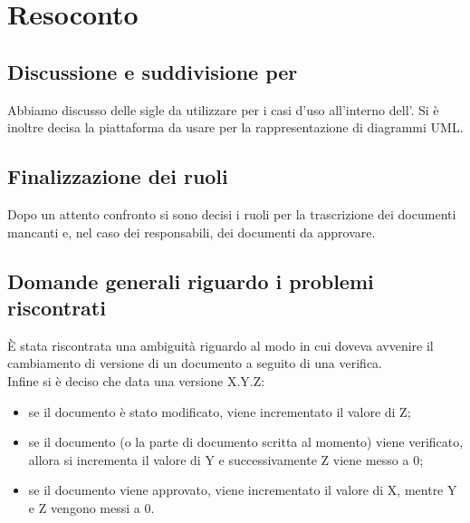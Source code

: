 \section{Resoconto}
\subsection{Discussione e suddivisione per \AdR}
Abbiamo discusso delle sigle da utilizzare per i casi d'uso all'interno dell'\AdR{}. Si è inoltre decisa la piattaforma da usare per la rappresentazione di diagrammi UML.

\subsection{Finalizzazione dei ruoli}
Dopo un attento confronto si sono decisi i ruoli per la trascrizione dei documenti mancanti e, nel caso dei responsabili, dei documenti da approvare. 

\subsection{Domande generali riguardo i problemi riscontrati}
È stata riscontrata una ambiguità riguardo al modo in cui doveva avvenire il cambiamento di versione di un documento a seguito di una verifica.\\ 
Infine si è deciso che data una versione X.Y.Z:
\begin{itemize}
\item se il documento è stato modificato, viene incrementato il valore di Z;
\item se il documento (o la parte di documento scritta al momento) viene verificato, allora si incrementa il valore di Y e successivamente Z viene messo a 0;
\item se il documento viene approvato, viene incrementato il valore di X, mentre Y e Z vengono messi a 0.

\end{itemize}

